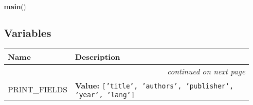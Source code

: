     \vspace{0.5ex}

\hspace{.8\funcindent}\begin{boxedminipage}{\funcwidth}

    \raggedright \textbf{main}()

\setlength{\parskip}{2ex}
\setlength{\parskip}{1ex}
    \end{boxedminipage}



  \subsection{Variables}

    \vspace{-1cm}
\hspace{\varindent}\begin{longtable}{|p{\varnamewidth}|p{\vardescrwidth}|l}
\cline{1-2}
\cline{1-2} \centering \textbf{Name} & \centering \textbf{Description}& \\
\cline{1-2}
\endhead\cline{1-2}\multicolumn{3}{r}{\small\textit{continued on next page}}\\\endfoot\cline{1-2}
\endlastfoot\raggedright P\-R\-I\-N\-T\-\_\-F\-I\-E\-L\-D\-S\- & \raggedright \textbf{Value:} 
{\tt \texttt{[}\texttt{'}\texttt{title}\texttt{'}\texttt{, }\texttt{'}\texttt{authors}\texttt{'}\texttt{, }\texttt{'}\texttt{publisher}\texttt{'}\texttt{, }\texttt{'}\texttt{year}\texttt{'}\texttt{, }\texttt{'}\texttt{lang}\texttt{'}\texttt{]}}&\\
\cline{1-2}
\end{longtable}


